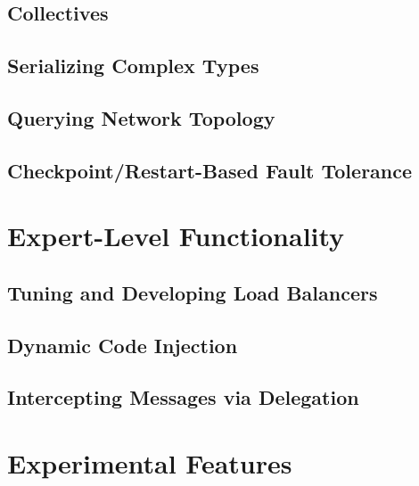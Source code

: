 \documentclass[10pt]{report}
\begin{document}
\chapter{Collectives}
  

\chapter{Serializing Complex Types}
  

\chapter{Querying Network Topology}
\label{topo}
  

\chapter{Checkpoint/Restart-Based Fault Tolerance}
\label{sec:checkpoint}
  



\part{Expert-Level Functionality}

\chapter{Tuning and Developing Load Balancers}
\label{advancedlb}
  

\chapter{Dynamic Code Injection}
\label{python}
  

\chapter{Intercepting Messages via Delegation}
\label{delegation}
  

%


\part{Experimental Features}
\end{document}
